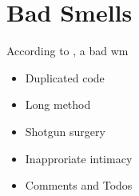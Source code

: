 \section{Bad Smells}
According to , a bad wm

\begin{itemize}
\item Duplicated code
\item Long method
\item Shotgun surgery
\item Inapproriate intimacy
\item Comments and Todos
\end{itemize}